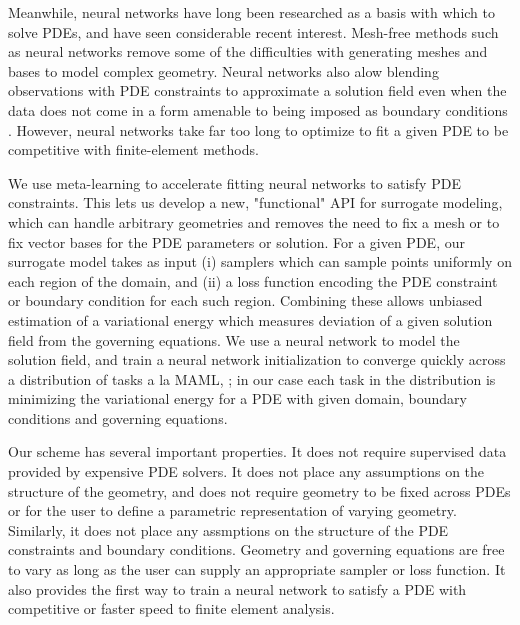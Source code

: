 Meanwhile, neural networks have long been researched as a basis with which
to solve PDEs, and have seen considerable recent interest.
Mesh-free methods such as neural networks remove some of the difficulties with
generating meshes and bases to model complex geometry.
Neural networks also alow blending observations with PDE constraints to approximate
a solution field even when the data does not come in a form amenable to being
imposed as boundary conditions \citep{raissi2019physics}.
However, neural networks take far too long to optimize to fit a given PDE to
be competitive with finite-element methods.

We use meta-learning to accelerate fitting neural networks to satisfy PDE constraints.
This lets us develop a new, "functional" API for surrogate modeling, which can handle
arbitrary geometries and removes the need to fix a mesh or to fix vector bases for the
PDE parameters or solution.
For a given PDE, our surrogate model takes as input
(i) samplers which can sample points uniformly on each region of the domain, and
(ii) a loss function encoding the PDE constraint or boundary condition for each such region.
Combining these allows unbiased estimation of a variational energy which measures
deviation of a given solution field from the governing equations.
We use a neural network to model the solution field, and train a neural network
initialization to converge quickly across a distribution of tasks
a la MAML, \citet{finn2017model}; in our case each task in the distribution
is minimizing the variational energy for a PDE with given domain, boundary
conditions and governing equations.

Our scheme has several important properties.
It does not require supervised data provided by expensive PDE solvers.
It does not place any assumptions on the structure of the geometry, and does not
require geometry to be fixed across PDEs or for the user to define a parametric
representation of varying geometry.
Similarly, it does not place any assmptions on the structure of the PDE constraints and
boundary conditions.
Geometry and governing equations are free to vary as long as the user can supply an
appropriate sampler or loss function.
It also provides the first way to train a neural network to satisfy a PDE
with competitive or faster speed to finite element analysis.
